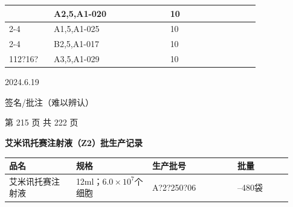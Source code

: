 \documentclass[UTF8,10pt,a4paper,fontset=fandol]{ctexart}
\newcommand{\fieldvalue}[1]{#1}
\newcommand{\handwritten}[1]{#1}
\begin{document}
\begin{tabular}{|p{0.15\linewidth}|p{0.39\linewidth}|p{0.18\linewidth}|p{0.12\linewidth}|}
&
\fieldvalue{\handwritten{A2,5,A1-020}}
&
\fieldvalue{\handwritten{10}} & \\ \cline{2-4}

&
\fieldvalue{\handwritten{A1,5,A1-025}}
&
\fieldvalue{\handwritten{10}} & \\ \cline{2-4}

&
\fieldvalue{\handwritten{B2,5,A1-017}}
&
\fieldvalue{\handwritten{10}} & \\ \hline

\fieldvalue{\handwritten{112?16?}}
&
\fieldvalue{\handwritten{A3,5,A1-029}}
&
\fieldvalue{\handwritten{10}} & \\ \hline
\end{tabular}

\medskip

\fieldvalue{\handwritten{2024.6.19}}

\fieldvalue{\handwritten{签名/批注（难以辨认）}}

\begin{center}
第 215 页 共 222 页
\end{center}

\newpage

\begin{center}
\textbf{艾米讯托赛注射液（Z2）批生产记录}
\end{center}

\noindent
\begin{tabular}{p{0.22\linewidth}p{0.25\linewidth}p{0.28\linewidth}p{0.18\linewidth}}
\hline
\centering 品名 & \centering 规格 & \centering 生产批号 & \centering 批量 \tabularnewline
\hline
\centering \fieldvalue{艾米讯托赛注射液} &
\centering \fieldvalue{12ml；$6.0\times10^{7}$个细胞} &
\centering \fieldvalue{\handwritten{A?2?250?06}} &
\centering \fieldvalue{200--480袋}
\tabularnewline
\hline
\end{tabular}
\end{document}
